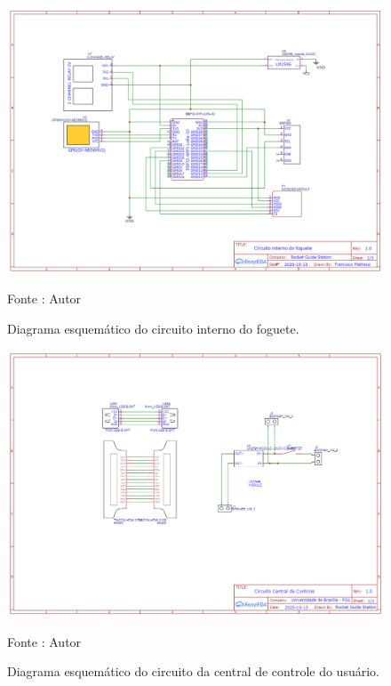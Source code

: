 \begin{figure}[H]
  \centering
  \includegraphics[scale=0.18]{figuras/Esquematico circuito interno ao foguete.png}
  \caption{Diagrama esquemático do circuito interno do foguete. } 
  {\footnotesize Fonte : Autor } 
  \label{fig:Diagrama esquematico do circuito interno do foguete}
\end{figure}

\begin{figure}[H]
  \centering
  \includegraphics[scale=0.35]{figuras/Schematic_Maleta.png}
  \caption{Diagrama esquemático do circuito da central de controle do usuário.} 
  {\footnotesize Fonte : Autor } 
  \label{fig:Diagrama esquemático do circuito da central de controle do usuário}
\end{figure}

